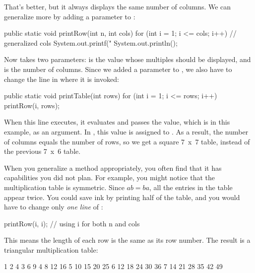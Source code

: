 That's better, but it always displays the same number of columns.
We can generalize more by adding a parameter to :

\begin{code}
public static void printRow(int n, int cols) {
    for (int i = 1; i <= cols; i++) {     // generalized cols
        System.out.printf("%
    }
    System.out.println();
}
\end{code}

Now  takes two parameters:  is the value whose multiples should be displayed, and  is the number of columns.
Since we added a parameter to , we also have to change the line in  where it is invoked:

\begin{code}
public static void printTable(int rows) {
    for (int i = 1; i <= rows; i++) {
        printRow(i, rows);
    }
}
\end{code}

When this line executes, it evaluates  and passes the value, which is  in this example, as an argument.
In , this value is assigned to .
As a result, the number of columns equals the number of rows, so we get a square \mbox{7 x 7} table, instead of the previous \mbox{7 x 6} table.


When you generalize a method appropriately, you often find that it has capabilities you did not plan.
For example, you might notice that the multiplication table is symmetric.
Since $ab = ba$, all the entries in the table appear twice.
You could save ink by printing half of the table, and you would have to change only {\em one line} of :

\begin{code}
printRow(i, i);  // using i for both n and cols
\end{code}

This means the length of each row is the same as its row number.
The result is a triangular multiplication table:

\begin{stdout}
   1
   2   4
   3   6   9
   4   8  12  16
   5  10  15  20  25
   6  12  18  24  30  36
   7  14  21  28  35  42  49
\end{stdout}


